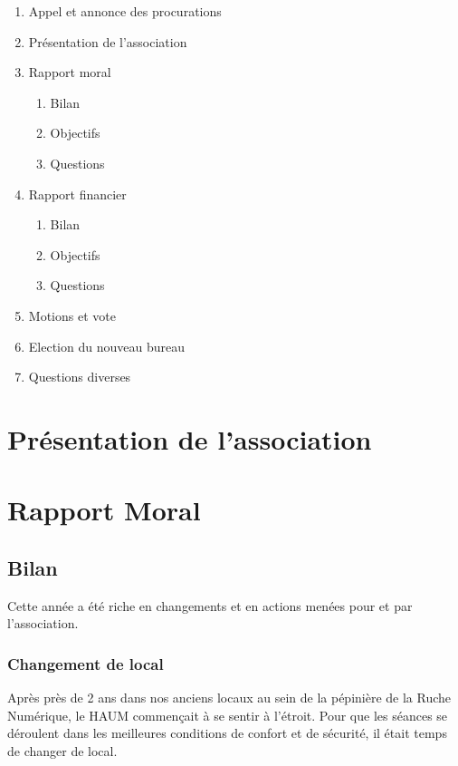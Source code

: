 \documentclass[11pt,twosided]{article}
\begin{document}
\begin{enumerate}
    \item Appel et annonce des procurations
    \item Présentation de l'association
    \item Rapport moral
        \begin{enumerate}
            \item Bilan
            \item Objectifs
            \item Questions
        \end{enumerate}
    \item Rapport financier
        \begin{enumerate}
            \item Bilan
            \item Objectifs
            \item Questions
        \end{enumerate}
    \item Motions et vote
    \item Election du nouveau bureau
    \item Questions diverses
\end{enumerate}

\section{Présentation de l'association}


\section{Rapport Moral}

\subsection{Bilan}

Cette année a été riche en changements et en actions menées pour et par l'association.

\subsubsection{Changement de local}

Après près de 2 ans dans nos anciens locaux au sein de la pépinière de la Ruche Numérique, le HAUM commençait à se sentir à l'étroit. Pour que les séances se déroulent dans les meilleures conditions de confort et de sécurité, il était temps de changer de local.
\end{document}
